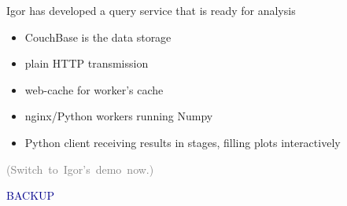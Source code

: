 \documentclass[aspectratio=169]{beamer}
\begin{document}
\begin{frame}{Igor has developed a query service that is ready for analysis}
\Large
\vspace{0.5 cm}
\begin{itemize}
\item CouchBase is the data storage
\item plain HTTP transmission
\item web-cache for worker's cache
\item nginx/Python workers running Numpy
\item Python client receiving results in stages, filling plots interactively
\end{itemize}

\begin{center}
\textcolor{gray}{\mbox{(Switch to Igor's demo now.)\hspace{1 cm}}}
\end{center}
\end{frame}

\begin{frame}{}
\huge
\begin{center}
\textcolor{darkblue}{BACKUP}
\end{center}
\end{frame}
\end{document}
